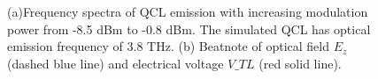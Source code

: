 \documentclass[11pt,final]{scrbook}
\begin{document}
\begin{figure}[htbp]
  \centering
\caption{(a)Frequency spectra of QCL emission with increasing modulation power from -8.5 dBm to -0.8 dBm. The simulated QCL has optical emission frequency of 3.8 THz. (b) Beatnote of optical field $E_{z}$ (dashed blue line) and electrical voltage $V\_{TL}$ (red solid line).}
\label{fig:modA_Beatnote}
\end{figure}
\end{document}
